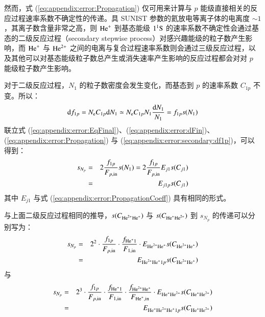 然而，式 (\ref{eq:appendix:error:Propagation}) 仅可用来计算与 $p$ 能级直接相关的反应过程速率系数不确定性的传递。具 SUNIST 参数的氦放电等离子体的电离度 $\sim 1$，其离子数含量非常之高，则 ${\rm He}^+$ 到基态能级 $1^1{\rm S}$ 的速率系数不确定性会通过基态的二级反应过程（secondary stepwise process）对感兴趣能级的粒子数产生影响，而 ${\rm He}^+$ 与 ${\rm He}^{2+}$ 之间的电离与复合过程速率系数则会通过三级反应过程，以及其他可以对基态能级粒子数总产生或消失速率产生影响的反应过程都会对对 $p$ 能级粒子数产生影响。

对于二级反应过程，$N_1$ 的粒子数密度会发生变化，而基态到 $p$ 的速率系数 $C_{1p}$ 不变。所以：
\begin{eqnarray}
{\rm d}f_{1p}=N_{\rm e}C_{1p}{\rm d}N_1\simeq N_{\rm e}C_{1p}N_1\frac{{\rm d}N_1}{N_1}=f_{1p}s(N_1)
\label{eq:appendix:error:secondary:df1p}
\end{eqnarray}
联立式 (\ref{eq:appendix:error:EqFinal})、(\ref{eq:appendix:error:dFin})、(\ref{eq:appendix:error:Propagation}) 与 (\ref{eq:appendix:error:secondary:df1p})，可以得到：
\begin{eqnarray}
s_{N_p}&=&2\frac{f_{1p}}{F_{p,{\rm in}}}s(N_1)
=2\frac{f_{1p}}{F_{p,{\rm in}}}E_{j1}s(C_{j1})\nonumber \\
&=&E_{j1p}s(C_{j1})
\label{eq:appendix:error:secondary:sigmaNp}
\end{eqnarray}
其中 $E_{j1}$ 与式 (\ref{eq:appendix:error:PropagationCoeff}) 具有相同的形式。

与上面二级反应过程相同的推导，$s(C_{{\rm He}^{2+}{\rm He}^+})$ 与 $s(C_{{\rm He}^+{\rm He}^{2+}})$ 到 $s_{N_p}$ 的传递可以分别写为：
\begin{eqnarray}
s_{N_p}&=&2^2\cdot\frac{f_{1p}}{F_{p,{\rm in}}}%
\cdot
\frac{f_{{\rm He}^+1}}{F_{1,{\rm in}}}
\cdot
E_{{\rm He}^{2+}{\rm He}^+}s(C_{{\rm He}^{2+}{\rm He}^+})\nonumber\\
&=&E_{{\rm He}^{2+}{\rm He}^+1p}s(C_{{\rm He}^{2+}{\rm He}^+})
\label{eq:appendix:error:HeII:sigmaNp}
\end{eqnarray}
与
\begin{eqnarray}
s_{N_p}&=&2^3\cdot\frac{f_{1p}}{F_{p,{\rm in}}}%
\cdot
\frac{f_{{\rm He}^+1}}{F_{1,{\rm in}}}
\cdot
\frac{f_{{\rm He}^{2+}{\rm He}^+}}{F_{{\rm He}^+,{\rm in}}}
\cdot
E_{{\rm He}^+{\rm He}^{2+}}s(C_{{\rm He}^+{\rm He}^{2+}})\nonumber\\
&=&E_{{\rm He}^+{\rm He}^{2+}{\rm He}^+1p}s(C_{{\rm He}^+{\rm He}^{2+}})
\label{eq:appendix:error:HeIII:sigmaNp}
\end{eqnarray}

